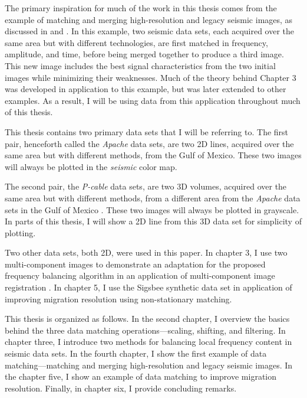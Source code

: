 The primary inspiration for much of the work in this thesis comes from the example of matching and merging high-resolution and legacy seismic images, as discussed in \cite{merge2} and \cite{merge}.
In this example, two seismic data sets, each acquired over the same area but with different technologies, are first matched in frequency, amplitude, and time, before being merged together to produce a third image.
This new image includes the best signal characteristics from the two initial images while minimizing their weaknesses.
Much of the theory behind Chapter 3 was developed in application to this example, but was later extended to other examples.
As a result, I will be using data from this application throughout much of this thesis.

This thesis contains two primary data sets that I will be referring to. 
The first pair, henceforth called the {\it Apache} data sets, are two 2D lines, acquired over the same area but with different methods, from the Gulf of Mexico. 
These two images will always be plotted in the {\em seismic} color map.

The second pair, the {\em P-cable} data sets, are two 3D volumes, acquired over the same area but with different methods, from a different area from the {\em Apache} data sets in the Gulf of Mexico \cite[]{pcable}.
These two images will always be plotted in grayscale.
In parts of this thesis, I will show a 2D line from this 3D data set for simplicity of plotting.

Two other data sets, both 2D, were used in this paper. 
In chapter 3, I use two multi-component images to demonstrate an adaptation for the proposed frequency balancing algorithm in an application of multi-component image registration \cite[]{attr}.
In chapter 5, I use the Sigsbee synthetic data set \cite[]{sigsbee} in application of improving migration resolution using non-stationary matching.

This thesis is organized as follows.
In the second chapter, I overview the basics behind the three data matching operations---scaling, shifting, and filtering.
In chapter three, I introduce two methods for balancing local frequency content in seismic data sets.
In the fourth chapter, I show the first example of data matching---matching and merging high-resolution and legacy seismic images.
In the chapter five, I show an example of data matching to improve migration resolution.
Finally, in chapter six, I provide concluding remarks.

